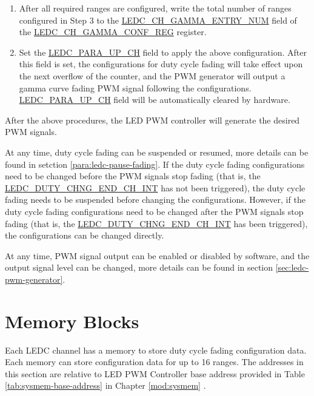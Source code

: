 \documentclass[main\_\_EN.tex]{subfiles}
\begin{document}
\begin{enumerate}
\begin{enumerate}
\begin{enumerate}
\begin{itemize}
            \end{itemize}
            \item After all required ranges are configured, write the total number of ranges configured in Step 3 to the \hyperref[fielddesc:LEDCCHNGAMMAENTRYNUM]{LEDC\_CH\_GAMMA\_ENTRY\_NUM} field of the \hyperref[regdesc:LEDCCHNGAMMACONFREG]{LEDC\_CH\_GAMMA\_CONF\_REG} register.
            \item Set the \hyperref[fielddesc:LEDCPARAUPCHN]{LEDC\_PARA\_UP\_CH} field to apply the above configuration. After this field is set, the configurations for duty cycle fading will take effect upon the next overflow of the counter, and the PWM generator will output a gamma curve fading PWM signal following the configurations. \hyperref[fielddesc:LEDCPARAUPCHN]{LEDC\_PARA\_UP\_CH} field will be automatically cleared by hardware.
        \end{enumerate}
    \end{enumerate}
\end{enumerate}

After the above procedures, the LED PWM controller will generate the desired PWM signals.

At any time, duty cycle fading can be suspended or resumed, more details can be found in setction \ref{para:ledc-pause-fading}. If the duty cycle fading configurations need to be changed before the PWM signals stop fading (that is, the \hyperref[int:ledc-duty-chng-end]{LEDC\_DUTY\_CHNG\_END\_CH\_INT} has not been triggered), the duty cycle fading needs to be suspended before changing the configurations. However, if the duty cycle fading configurations need to be changed after the PWM signals stop fading (that is, the \hyperref[int:ledc-duty-chng-end]{LEDC\_DUTY\_CHNG\_END\_CH\_INT} has been triggered), the configurations can be changed directly.

At any time, PWM signal output can be enabled or disabled by software, and the output signal level can be changed, more details can be found in section \ref{sec:ledc-pwm-generator}.



\section{Memory Blocks}

Each LEDC channel has a memory to store duty cycle fading configuration data. Each memory can store configuration data for up to 16 ranges. The addresses in this section are relative to LED PWM Controller base address provided in Table \ref{tab:sysmem-base-address} in Chapter \ref{mod:sysmem} \textit{}.
\end{document}
